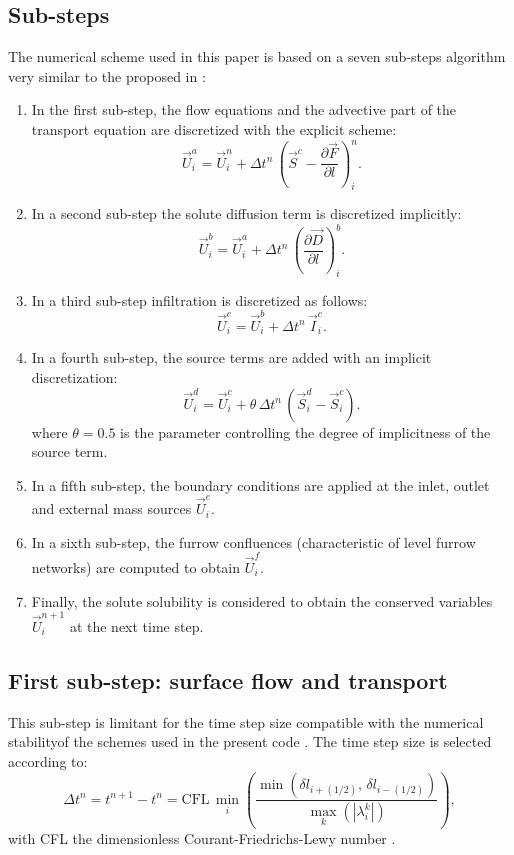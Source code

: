 \documentclass[review,authoryear]{elsarticle}
\newcommand{\eq}[2]{\begin{equation}\label{#2}#1\end{equation}}
\newcommand{\PARTIAL}[2] {\frac{\partial#1}{\partial#2}}
\newcommand{\PA}[1] {\left(#1\right)}
\newcommand{\ABS}[1] {\left|#1\right|}
\newcommand{\IR}{_{i+(1/2)}}
\newcommand{\IL}{_{i-(1/2)}}
\begin{document}
\subsection{Sub-steps}

The numerical scheme used in this paper is based on a seven sub-steps algorithm
very similar to the proposed in \cite{JaviSurcos1}:
\begin{enumerate}
\item In the first sub-step, the flow equations and the advective part of the
transport equation are discretized with the explicit scheme:
\eq
{\vec{U}_i^a=\vec{U}_i^n+\Delta t^n\,\PA{\vec{S}^c-\PARTIAL{\vec{F}}{l}}_i^n.}
{EqSolvA}
\item In a second sub-step the solute diffusion term is discretized implicitly:
\eq{\vec{U}_i^b=\vec{U}_i^a+\Delta t^n\,\PA{\PARTIAL{\vec{D}}{l}}_i^b.}{EqSolvB}
\item In a third sub-step infiltration is discretized as follows:
\eq{\vec{U}_i^c=\vec{U}_i^b+\Delta t^n\,\vec{I}_i^c.}{EqSolvC}
\item In a fourth sub-step, the source terms are added with an implicit
discretization:
\eq{\vec{U}_i^d=\vec{U}_i^c+\theta\,\Delta t^n\,\PA{\vec{S}_i^d-\vec{S}_i^c}.}
{EqSolvD}
where $\theta=0.5$ is the parameter controlling the degree of implicitness of
the source term.
\item In a fifth sub-step, the boundary conditions are applied at the inlet,
outlet and external mass sources $\vec{U}_i^e$.
\item In a sixth sub-step, the furrow confluences (characteristic of level
furrow networks) are computed to obtain $\vec{U}_i^f$.
\item Finally, the solute solubility is considered to obtain the conserved
variables $\vec{U}_i^{n+1}$ at the next time step.
\end{enumerate}

\subsection{First sub-step: surface flow and transport}

This sub-step is limitant for the time step size compatible with the numerical
stabilityof the schemes used in the present code \citep{JaviSurcos1}. The time
step size is selected according to:
\eq
{
	\Delta t^n=t^{n+1}-t^n=\mathrm{CFL}\,
	\min_i\PA{\frac{\min\PA{\delta l\IR,\,\delta l\IL}}
	{\max_k\PA{\ABS{\lambda_i^k}}}},
}{EqCFL}
with CFL the dimensionless Courant-Friedrichs-Lewy number \citep{CFL}.
\end{document}
